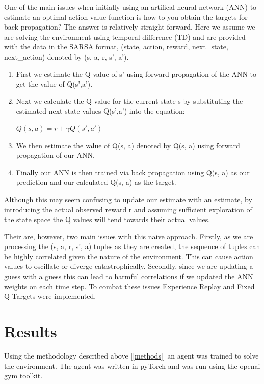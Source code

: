 \documentclass[12pt]{article}
\begin{document}
One of the main issues when initially using an artifical neural network (ANN) to estimate an optimal action-value function 
is how to you obtain the targets for back-propagation?
The answer is relatively straight forward.
Here we assume we are solving the environment using temporal difference (TD) and are provided with the data in 
the SARSA format, (state, action, reward, next\_state, next\_action) denoted by (s, a, r, s', a').

\begin{enumerate}
	\item First we estimate the Q value of s' using forward propagation of the ANN to get the value of Q(s',a').
	\item Next we calculate the Q value for the current state s by substituting the estimated next state values Q(s',a') 
			into the equation:
	\begin{center}
		$Q(s,a) = r+\gamma Q(s',a') $
	\end{center}
	\item We then estimate the value of Q(s, a) denoted by \^Q(s, a) using forward propagation of our ANN.
	\item Finally our ANN is then trained via back propagation using  \^Q(s, a) as our prediction and our calculated Q(s, a) as the target.
\end{enumerate}

Although this may seem confusing to update our estimate with an estimate, by introducing the actual observed reward r 
and assuming sufficient exploration of the state space the Q values will tend towards their actual values.

Their are, however, two main issues with this naive approach. 
Firstly, as we are processing the (s, a, r, s', a) tuples as they are created, the sequence of tuples can be highly correlated
given the nature of the environment.
This can cause action values to oscillate or diverge catastrophically.
Secondly, since we are updating a guess with a guess this can lead to harmful correlations if we updated the ANN weights on each time step.
To combat these issues Experience Replay\cite{experience_replay} and Fixed Q-Targets\cite{deep_q_networks} were implemented.

\section{Results}

Using the methodology described above [\ref{methods}] an agent was trained to solve the environment.
The agent was written in pyTorch and was run using the openai gym toolkit.
\end{document}
